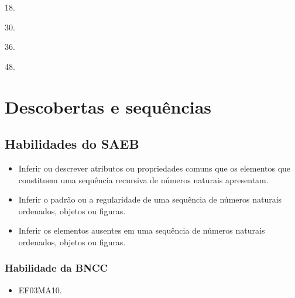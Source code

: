 \begin{multicols}{2}
\begin{escolha}
\item
  18.
\item
  30.
\item
  36.
\item
  48.
\end{escolha}
\end{multicols}
\chapter{Descobertas e sequências}
\enlargethispage{\baselineskip}

\section*{Habilidades do SAEB}

\begin{itemize}
\item Inferir ou descrever atributos ou propriedades comuns que os elementos
que constituem uma sequência recursiva de números naturais apresentam.

\item Inferir o padrão ou a regularidade de uma sequência de números
naturais ordenados, objetos ou figuras.

\item Inferir os elementos ausentes em uma sequência de números naturais
ordenados, objetos ou figuras.
\end{itemize}

\subsection{Habilidade da BNCC}

\begin{itemize}
\item EF03MA10.
\end{itemize}

